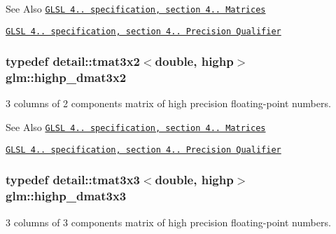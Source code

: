 \begin{DoxySeeAlso}{See Also}
\href{http://www.opengl.org/registry/doc/GLSLangSpec.4.20.8.pdf}{\tt G\-L\-S\-L 4.. specification, section 4.. Matrices} 

\href{http://www.opengl.org/registry/doc/GLSLangSpec.4.20.8.pdf}{\tt G\-L\-S\-L 4.. specification, section 4.. Precision Qualifier} 
\end{DoxySeeAlso}
\hypertarget{group__core__precision_gac956fe6b946f0ccee78367ccd5427351}{
\subsubsection[{highp\-\_\-dmat3x2}]{\setlength{\rightskip}{0pt plus 5cm}typedef detail\-::tmat3x2$<$double, highp$>$ {\bf glm\-::highp\-\_\-dmat3x2}}}\label{group__core__precision_gac956fe6b946f0ccee78367ccd5427351}
3 columns of 2 components matrix of high precision floating-\/point numbers.

\begin{DoxySeeAlso}{See Also}
\href{http://www.opengl.org/registry/doc/GLSLangSpec.4.20.8.pdf}{\tt G\-L\-S\-L 4.. specification, section 4.. Matrices} 

\href{http://www.opengl.org/registry/doc/GLSLangSpec.4.20.8.pdf}{\tt G\-L\-S\-L 4.. specification, section 4.. Precision Qualifier} 
\end{DoxySeeAlso}
\hypertarget{group__core__precision_gad7229dea82287910d88e6e8566e39fc7}{
\subsubsection[{highp\-\_\-dmat3x3}]{\setlength{\rightskip}{0pt plus 5cm}typedef detail\-::tmat3x3$<$double, highp$>$ {\bf glm\-::highp\-\_\-dmat3x3}}}\label{group__core__precision_gad7229dea82287910d88e6e8566e39fc7}
3 columns of 3 components matrix of high precision floating-\/point numbers.

